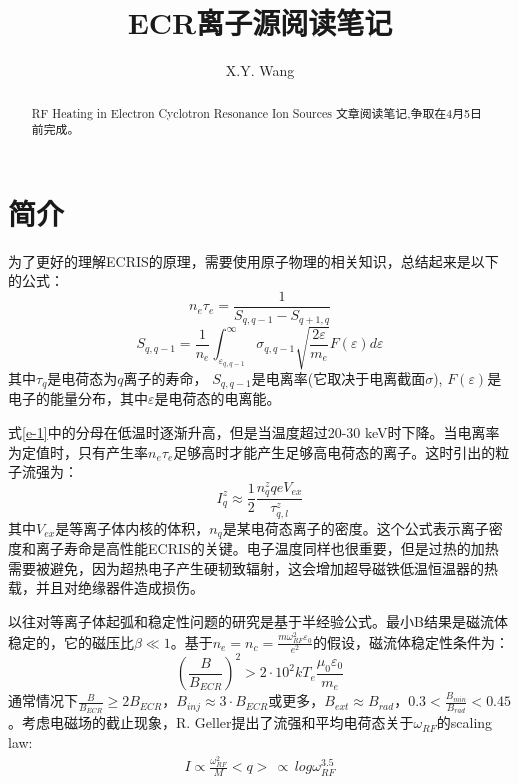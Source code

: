 \documentclass[fontset=windows]{article}
\title{ECR离子源阅读笔记}
\author{X.Y. Wang}
\begin{document}
\maketitle

\begin{abstract}
RF Heating in Electron Cyclotron Resonance Ion Sources 文章阅读笔记,争取在4月5日前完成。
\end{abstract}

\section{简介}
为了更好的理解ECRIS的原理，需要使用原子物理的相关知识，总结起来是以下的公式：
\begin{equation}
    n_e\tau_e=\frac{1}{S_{q,q-1}-S_{q+1,q}}
    \label{e-1}
\end{equation}
\begin{equation}
    S_{q,q-1}=\frac{1}{n_e}\int_{\varepsilon_{q,q-1}}^{\infty}\sigma_{q,q-1}\sqrt{\frac{2\varepsilon}{m_e}}F(\varepsilon)d\varepsilon
    \label{e-2}
\end{equation}
其中$\tau_q$是电荷态为$q$离子的寿命， $S_{q,q-1}$是电离率(它取决于电离截面$\sigma$), $F(\varepsilon)$是电子的能量分布，其中$\varepsilon$是电荷态的电离能。

式\ref{e-1}中的分母在低温时逐渐升高，但是当温度超过20-30 keV时下降。当电离率为定值时，只有产生率$n_e\tau_e$足够高时才能产生足够高电荷态的离子。这时引出的粒子流强为：
\begin{equation}
    I_q^z\approx\frac{1}{2}\frac{n_q^zqeV_{ex}}{\tau_{q,l}^z}
\end{equation}
其中$V_{ex}$是等离子体内核的体积，$n_q$是某电荷态离子的密度。这个公式表示离子密度和离子寿命是高性能ECRIS的关键。电子温度同样也很重要，但是过热的加热需要被避免，因为超热电子产生硬韧致辐射，这会增加超导磁铁低温恒温器的热载，并且对绝缘器件造成损伤。

以往对等离子体起弧和稳定性问题的研究是基于半经验公式。最小B结果是磁流体稳定的，它的磁压比$\beta\ll1$。基于$n_e=n_c=\frac{m\omega_{RF}^2\varepsilon_0}{e^2}$的假设，磁流体稳定性条件为：
\begin{equation}
    (\frac{B}{B_{ECR}})^2>2\cdot10^2kT_e\frac{\mu_0\varepsilon_0}{m_e}
\end{equation}
通常情况下$\frac{B}{B_{ECR}}\geq2B_{ECR}$，$B_{inj}\approx3\cdot B_{ECR}$或更多，$B_{ext}\approx B_{rad}$，$0.3<\frac{B_{min}}{B_{rad}}<0.45$。考虑电磁场的截止现象，R. Geller提出了流强和平均电荷态关于$\omega_{RF}$的scaling law:
\begin{align}
    I\propto\frac{\omega_{RF}^2}{M}
    <q>\,\propto\, log\omega_{RF}^{3.5}
\end{align}
\end{document}
